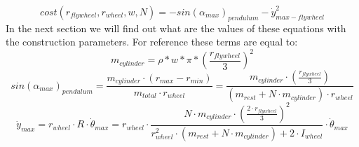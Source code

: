 \begin{equation}
	cost(r_{flywheel},r_{wheel},w,N) = - sin(\alpha_{max})_{pendulum} -\dot{y}^2_{max-flywheel}
	\label{eq: cost}
\end{equation}
In the next section we will find out what are the values 
of these equations with the construction parameters. 
For reference these terms are equal to:
\begin{equation*}
	m_{cylinder} = \rho * w * \pi * (\frac{r_{flywheel}}{3})^2
\end{equation*}
\begin{equation*}
	sin(\alpha_{max})_{pendulum} = \frac{m_{cylinder} \cdot  (r_{max} - r_{min})}{m_{total} \cdot r_{wheel}} = \frac{m_{cylinder} \cdot  (\frac{r_{flywheel}}{3})}{(m_{rest} + N \cdot m_{cylinder})\cdot r_{wheel}} 	
\end{equation*}
\begin{equation*}
	\dot{y}_{max} = r_{wheel} \cdot  R \cdot  \dot{\theta}_{max} =r_{wheel} \cdot  \frac{ N \cdot  m_{cylinder} \cdot  (\frac{2\cdot r_{flywheel}}{3})^2}
    {r_{wheel}^2\cdot (m_{rest} + N \cdot m_{cylinder}) +  2\cdot I_{wheel}} \cdot  \dot{\theta}_{max}
\end{equation*}

